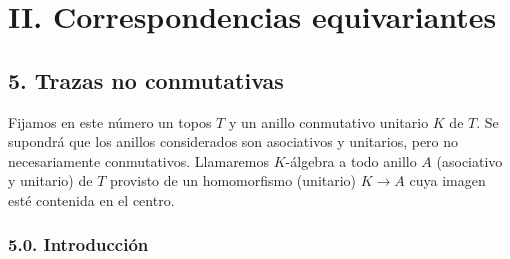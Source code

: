 \section*{II. Correspondencias equivariantes}

\subsection*{5. Trazas no conmutativas}

Fijamos en este número un topos $T$ y un anillo conmutativo unitario $K$ de $T$. Se supondrá que los anillos considerados son asociativos y unitarios, pero no necesariamente conmutativos. Llamaremos $K$-álgebra a todo anillo $A$ (asociativo y unitario) de $T$ provisto de un homomorfismo (unitario) $K\to A$ cuya imagen esté contenida en el centro.

\subsubsection*{5.0. Introducción}

